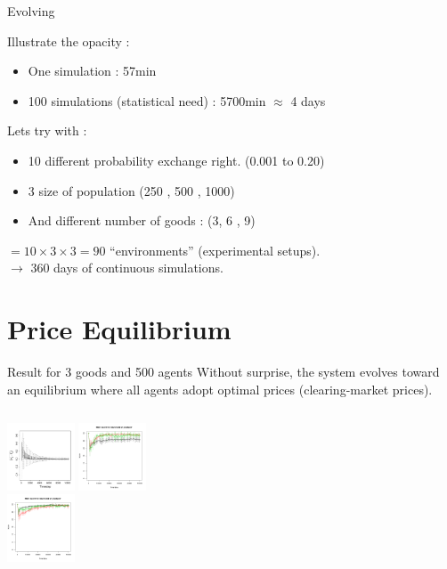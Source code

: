 \documentclass[final]{beamer}
\begin{document}
\begin{frame}
\begin{block}{Evolving}
	\end{block}



	Illustrate the opacity :
		\begin{itemize}
			\item 	\alert{One simulation : 57min}
			\item	100 simulations (statistical need) : 5700min $\approx$ 4 days
		\end{itemize}

	Lets try with :
	\begin{itemize}
		\item 	10 different probability exchange right. (0.001 to 0.20)
		\item 	3 size of population (250 , 500 , 1000)
		\item 	And different number of goods : (3, 6 , 9)
	\end{itemize}

	\begin{center}
		$= 10 \times 3 \times 3 = 90 $ ``environments'' (experimental setups).\\
		\vfill
		$\rightarrow$ \alert{360 days of continuous simulations.}


	\end{center}



\section{Price Equilibrium}

	\begin{block}{Result for 3 goods and 500 agents}
		Without surprise, the system evolves toward an equilibrium where all agents adopt optimal prices (clearing-market prices). 
	\end{block}
	\begin{columns}
		\column{5cm}
		\includegraphics[height=2cm]{./ClearingPriceDistanceEvolutionForTrade-G3N500.pdf}
		\column{35cm}
		\includegraphics[width=2cm]{./scoreEx1.png}\\
		 \includegraphics[width=2cm]{./scoreEx2.png}
	\end{columns}
	




\end{frame}
\end{document}
